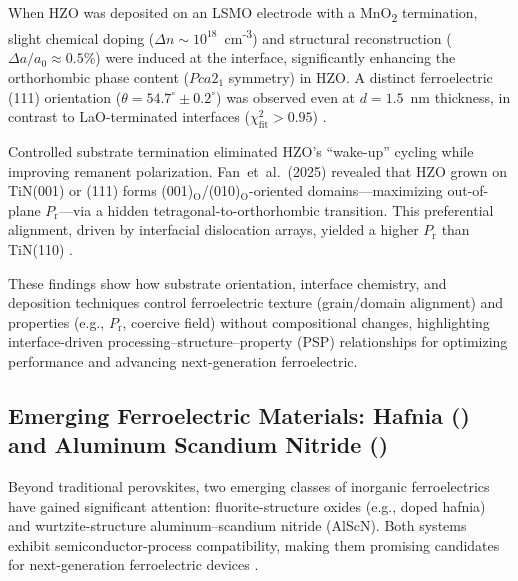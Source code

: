 \documentclass[a4paper,fleqn]{cas-sc}
\begin{document}
When HZO was deposited on an LSMO electrode with a MnO\textsubscript{2} termination, slight chemical doping ($\Delta n \sim 10^{18}$~cm\textsuperscript{-3}) and structural reconstruction ($\Delta a/a_0 \approx 0.5\%$) were induced at the interface, significantly enhancing the orthorhombic phase content ($Pca2_1$ symmetry) in HZO. A distinct ferroelectric (111) orientation ($\theta = 54.7^\circ \pm 0.2^\circ$) was observed even at $d = 1.5$~nm thickness, in contrast to LaO-terminated interfaces ($\chi^2_{\text{fit}} > 0.95$) \cite{shi2023interface}. 


Controlled substrate termination eliminated HZO's ``wake-up'' cycling while improving remanent polarization. Fan~et~al.\ (2025) revealed that HZO grown on TiN(001) or (111) forms (001)$_{\text{O}}$/(010)$_{\text{O}}$-oriented domains---maximizing out-of-plane $P_{\text{r}}$---via a hidden tetragonal-to-orthorhombic transition. This preferential alignment, driven by interfacial dislocation arrays, yielded a higher $P_{\text{r}}$ than TiN(110) \cite{fan2025hidden}. 

These findings show how substrate orientation, interface chemistry, and deposition techniques control ferroelectric texture (grain/domain alignment) and properties (e.g., $P_\mathrm{r}$, coercive field) without compositional changes, highlighting interface-driven processing--structure--property (PSP) relationships for optimizing performance and advancing next-generation ferroelectric.

\subsection*{Emerging Ferroelectric Materials: Hafnia () and Aluminum Scandium Nitride ()}
\par Beyond traditional perovskites, two emerging classes of inorganic ferroelectrics have gained significant attention: fluorite-structure oxides (e.g., doped hafnia) and wurtzite-structure aluminum–scandium nitride (AlScN). Both systems exhibit semiconductor-process compatibility, making them promising candidates for next-generation ferroelectric devices \cite{yang2020electrocaloric,zhang2024new,qin2024perspectives}. 
\end{document}
